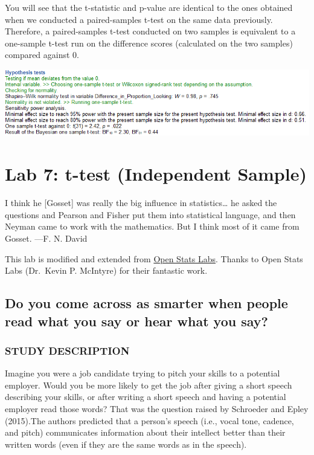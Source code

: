 \documentclass[
]{book}
\begin{document}
You will see that the t-statistic and p-value are identical to the ones obtained when we conducted a paired-samples t-test on the same data previously. Therefore, a paired-samples t-test conducted on two samples is equivalent to a one-sample t-test run on the difference scores (calculated on the two samples) compared against 0.

\includegraphics{img/ch6/6.8expvar_hyptest.png}

\hypertarget{lab-7-t-test-independent-sample}{%
\chapter{Lab 7: t-test (Independent Sample)}\label{lab-7-t-test-independent-sample}}

{
I think he {[}Gosset{]} was really the big influence in
statistics\ldots{} he asked the questions and Pearson and Fisher put them into statistical language, and then Neyman came to work with the mathematics. But I think
most of it came from Gosset.
---F. N. David
}

This lab is modified and extended from \href{https://sites.trinity.edu/osl}{Open Stats Labs}. Thanks to Open Stats Labs (Dr.~Kevin P. McIntyre) for their fantastic work.

\hypertarget{do-you-come-across-as-smarter-when-people-read-what-you-say-or-hear-what-you-say}{%
\section{Do you come across as smarter when people read what you say or hear what you say?}\label{do-you-come-across-as-smarter-when-people-read-what-you-say-or-hear-what-you-say}}

\hypertarget{study-description-2}{%
\subsection{STUDY DESCRIPTION}\label{study-description-2}}

Imagine you were a job candidate trying to pitch your skills to a potential employer. Would you be more likely to get the job after giving a short speech describing your skills, or after writing a short speech and having a potential employer read those words? That was the question raised by Schroeder and Epley (2015).The authors predicted that a person's speech (i.e., vocal tone, cadence, and pitch) communicates information about their intellect better than their written words (even if they are the same words as in the speech).
\end{document}
